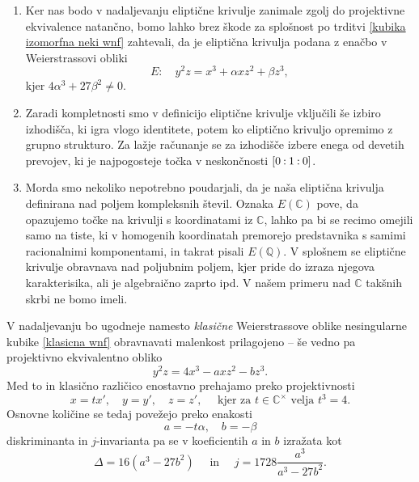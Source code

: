 \documentclass[mat1]{fmfdelo}
\numberwithin{equation}{section}
\newcommand{\C}{\mathbb C}
\newcommand{\CM}{\mathbb C ^\times}
\newcommand{\Q}{\mathbb Q}
\newcommand{\pcoor}[1]{%
\begingroup\lccode`~=`: \lowercase{\endgroup
\edef~}{\mathbin{\mathchar\the\mathcode`:}\nobreak}%
\left[%
\begingroup
\mathcode`:=\string"8000
#1%
\endgroup
\right]%
}
\theoremstyle{definition}
\begin{document}
\begin{opomba}
    \begin{enumerate}
        \item
        Ker nas bodo v nadaljevanju eliptične krivulje zanimale zgolj do projektivne ekvivalence natančno, bomo lahko brez škode za splošnost po trditvi \ref{kubika izomorfna neki wnf} zahtevali, da je eliptična krivulja podana z enačbo v Weierstrassovi obliki
        \[
            E: \quad y^2z = x^3 + \alpha x z^2 + \beta z^3,  
        \]  
        kjer $4\alpha^3 + 27\beta^2 \neq 0$. 
        \item 
        Zaradi kompletnosti smo v definicijo eliptične krivulje vključili še izbiro izhodišča, ki igra vlogo identitete, potem ko eliptično krivuljo opremimo z grupno strukturo. Za lažje računanje se za izhodišče izbere enega od devetih prevojev, ki je najpogosteje točka v neskončnosti $\pcoor{0:1:0}$.  
        \item 
        Morda smo nekoliko nepotrebno poudarjali, da je naša eliptična krivulja definirana nad poljem kompleksnih števil. Oznaka $E(\C)$ pove, da opazujemo točke na krivulji s koordinatami iz $\C$, lahko pa bi se recimo omejili samo na tiste, ki v homogenih koordinatah premorejo predstavnika s samimi racionalnimi komponentami, in takrat pisali $E(\Q)$. V splošnem se eliptične krivulje obravnava nad poljubnim poljem, kjer pride do izraza njegova karakterisika, ali je algebraično zaprto ipd. V našem primeru nad $\C$ takšnih skrbi ne bomo imeli. 
    \end{enumerate}
\end{opomba}

V nadaljevanju bo ugodneje namesto \emph{klasične} Weierstrassove oblike nesingularne kubike \ref{klasicna wnf} obravnavati malenkost prilagojeno -- še vedno pa projektivno ekvivalentno obliko
\[
    y^2z = 4x^3 - axz^2 - bz^3.  
\]
Med to in klasično različico enostavno prehajamo preko projektivnosti
\[
    x = tx', \quad y = y', \quad z = z', \quad \text{ kjer za } t \in \CM \text{ velja } t^3 = 4.   
\]
Osnovne količine se tedaj povežejo preko enakosti
\[
    a = -t\alpha, \quad b = -\beta    
\]
diskriminanta in $j$-invarianta pa se v koeficientih $a$ in $b$ izražata kot
\begin{equation}
    \label{transformacija diskriminante in j-invariante}    
    \Delta = 16(a^3 - 27b^2) \quad \text{ in } \quad j = 1728\frac{a^3}{a^3 - 27b^2}.
\end{equation}


\end{document}
